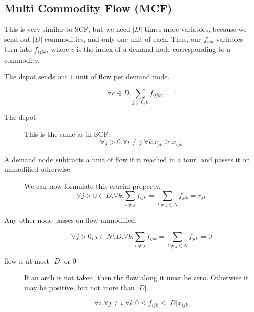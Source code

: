 \subsection{Multi Commodity Flow (MCF)}

This is very similar to SCF, but we need $|D|$ times more variables, because we send out $|D|$ commodities, and only one unit of each. Thus, our $f_{ijk}$ variables turn into $f_{ijkc}$, where $c$ is the index of a demand node corresponding to a commodity.

\begin{description}
  \item[The depot sends out $1$ unit of flow per demand node.]
     \begin{equation}
       \forall c \in D. \sum_{j>0,k} f_{0jkc} = 1
     \end{equation}

  \item[The depot 

  \item[A node is either reached in a certain tour or not.] This is the same as in SCF.
     \begin{equation}
        \forall j>0. \forall i \neq j. \forall k. r_{jk} \geq x_{ijk}
     \end{equation}

  \item[A demand node subtracts a unit of flow if it reached in a tour, and passes it on unmodified
        otherwise.] We can now formulate this crucial property.
  \begin{equation}
        \forall j>0 \in D. \forall k. \sum_{i \neq j} f_{ijk} = \sum_{l \neq j \in N} f_{jlk} = r_{jk}
  \end{equation}

  \item[Any other node passes on flow unmodified.]
  \begin{equation}
        \forall j>0, j \in N \setminus D. \forall k. \sum_{i \neq j} f_{ijk} = \sum_{l \neq j \in N} f_{jlk} = 0
  \end{equation}

  \item[flow is at most $|D|$ or $0$] 

  If an arch is not taken, then the flow along it must be zero. Otherwise it may be positive, but 
  not more than $|D|$.

  \begin{equation}
        \forall i. \forall j \neq i. \forall k. 0 \leq f_{ijk} \leq |D| x_{ijk}
  \end{equation}


\end{description}
